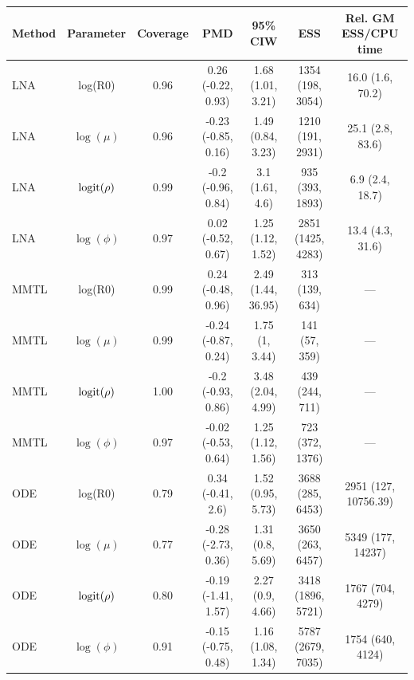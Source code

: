 \begin{table}
\begin{fullpage}
	\end{fullpage}
\end{table}

\begin{table}
	\begin{fullpage}
		\footnotesize
		\centering
		\begin{tabular}{lcccccc}
			\hline
			\textbf{Method} & \textbf{Parameter} & \textbf{Coverage} & \textbf{PMD} & \textbf{95\% CIW} & \textbf{ESS} & \textbf{Rel. GM ESS/CPU time} \\ 
			\hline
			LNA & log(R0) & 0.96 & 0.26 (-0.22, 0.93) & 1.68 (1.01, 3.21) & 1354 (198, 3054) & 16.0 (1.6, 70.2) \\ 
			LNA & $\log(\mu)$ & 0.96 & -0.23 (-0.85, 0.16) & 1.49 (0.84, 3.23) & 1210 (191, 2931) & 25.1 (2.8, 83.6) \\ 
			LNA & $\mathrm{logit}(\rho)$ & 0.99 & -0.2 (-0.96, 0.84) & 3.1 (1.61, 4.6) & 935 (393, 1893) & 6.9 (2.4, 18.7) \\ 
			LNA & $\log(\phi)$ & 0.97 & 0.02 (-0.52, 0.67) & 1.25 (1.12, 1.52) & 2851 (1425, 4283) & 13.4 (4.3, 31.6) \\ 
			MMTL & log(R0) & 0.99 & 0.24 (-0.48, 0.96) & 2.49 (1.44, 36.95) & 313 (139, 634) & --- \\ 
			MMTL & $\log(\mu)$ & 0.99 & -0.24 (-0.87, 0.24) & 1.75 (1, 3.44) & 141 (57, 359) & --- \\ 
			MMTL & $\mathrm{logit}(\rho)$ & 1.00 & -0.2 (-0.93, 0.86) & 3.48 (2.04, 4.99) & 439 (244, 711) & --- \\ 
			MMTL & $\log(\phi)$ & 0.97 & -0.02 (-0.53, 0.64) & 1.25 (1.12, 1.56) & 723 (372, 1376) & --- \\ 
			ODE & log(R0) & 0.79 & 0.34 (-0.41, 2.6) & 1.52 (0.95, 5.73) & 3688 (285, 6453) & 2951 (127, 10756.39) \\ 
			ODE & $\log(\mu)$ & 0.77 & -0.28 (-2.73, 0.36) & 1.31 (0.8, 5.69) & 3650 (263, 6457) & 5349 (177, 14237) \\ 
			ODE & $\mathrm{logit}(\rho)$ & 0.80 & -0.19 (-1.41, 1.57) & 2.27 (0.9, 4.66) & 3418 (1896, 5721) & 1767 (704, 4279) \\ 
			ODE & $\log(\phi)$ & 0.91 & -0.15 (-0.75, 0.48) & 1.16 (1.08, 1.34) & 5787 (2679, 7035) & 1754 (640, 4124) \\ 
			\hline
		\end{tabular}

\end{fullpage}
\end{table}
